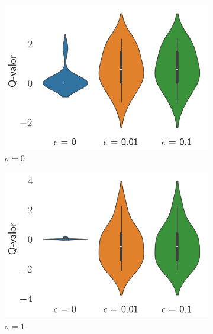 \documentclass[12pt]{article}
\begin{document}
    \begin{figure}[H]
        \centering

        \begin{subfigure}[H]{0.3\textwidth}
            \includegraphics[width=\textwidth]{../img/values_sigma_0}
            \caption{$\sigma=0$}
            \label{fig:estimations_0}
        \end{subfigure}
        \begin{subfigure}[H]{0.3\textwidth}
            \includegraphics[width=\textwidth]{../img/values_sigma_1}
            \caption{$\sigma=1$}
            \label{fig:estimations_1}
        \end{subfigure}
        \begin{subfigure}[H]{0.3\textwidth}

\end{subfigure}
\end{figure}
\end{document}
